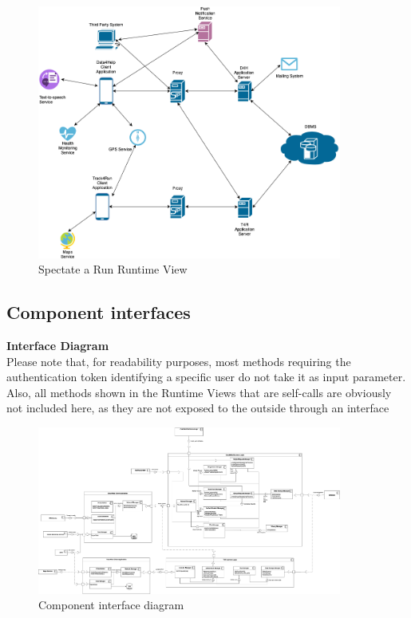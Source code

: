 \documentclass[titlepage]{article}
\begin{document}
\begin{figure}[H]
	\center
  	\includegraphics[width=10cm]{Overview.png} %
  	\caption{Spectate a Run Runtime View}
 	\label{fig:SPEC}
\end{figure}

\pagebreak



\subsection{Component interfaces}

{\bf Interface Diagram }\\ 
Please note that, for readability purposes, most methods requiring the authentication token identifying a specific user do not take it as input parameter.
Also, all methods shown in the Runtime Views that are self-calls are obviously not included here, as they are not exposed to the outside through an interface

\begin{figure}[H]
	\center
  	\includegraphics[width=10cm]{ComponentInterfaces.png}
  	\caption{Component interface diagram}
 	\label{fig:INT}
\end{figure}
\end{document}
